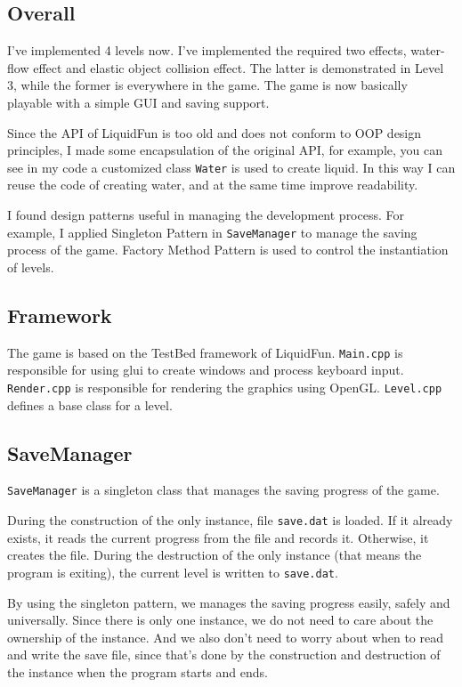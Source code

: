 \documentclass{article}
\begin{document}
\subsection{Overall}
I've implemented 4 levels now. I've implemented the required two effects, water-flow effect and elastic object collision effect. The latter is demonstrated in Level 3, while the former is everywhere in the game.
The game is now basically playable with a simple GUI and saving support.

Since the API of LiquidFun is too old and does not conform to OOP design principles, I made some encapsulation of the original API, for example, you can see in my code a customized class \verb|Water| is used to create liquid.
In this way I can reuse the code of creating water, and at the same time improve readability.

I found design patterns useful in managing the development process. For example, I applied Singleton Pattern in \verb|SaveManager| to manage the saving process of the game. 
Factory Method Pattern is used to control the instantiation of levels.

\subsection{Framework}
The game is based on the TestBed framework of LiquidFun.
\verb|Main.cpp| is responsible for using glui to create windows and process keyboard input.
\verb|Render.cpp| is responsible for rendering the graphics using OpenGL.
\verb|Level.cpp| defines a base class for a level.

\subsection{SaveManager}
\verb|SaveManager| is a singleton class that manages the saving progress of the game.

During the construction of the only instance, file \verb|save.dat| is loaded. If it already exists, it reads the current progress from the file and records it. Otherwise, it creates the file.
During the destruction of the only instance (that means the program is exiting), the current level is written to \verb|save.dat|.

By using the singleton pattern, we manages the saving progress easily, safely and universally.
Since there is only one instance, we do not need to care about the ownership of the instance.
And we also don't need to worry about when to read and write the save file, since that's done by the construction and destruction of the instance when the program starts and ends.
\end{document}
